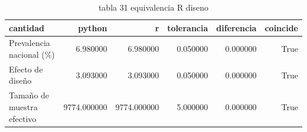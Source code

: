 \begin{table}[htbp]
\caption{tabla 31 equivalencia R diseno}
\label{tab:tabla_31_equivalencia_R_diseno}
\begin{tabular}{lrrrrr}
\toprule
cantidad & python & r & tolerancia & diferencia & coincide \\
\midrule
Prevalencia nacional (\%) & 6.980000 & 6.980000 & 0.050000 & 0.000000 & True \\
Efecto de diseño & 3.093000 & 3.093000 & 0.050000 & 0.000000 & True \\
Tamaño de muestra efectivo & 9774.000000 & 9774.000000 & 5.000000 & 0.000000 & True \\
\bottomrule
\end{tabular}
\end{table}

